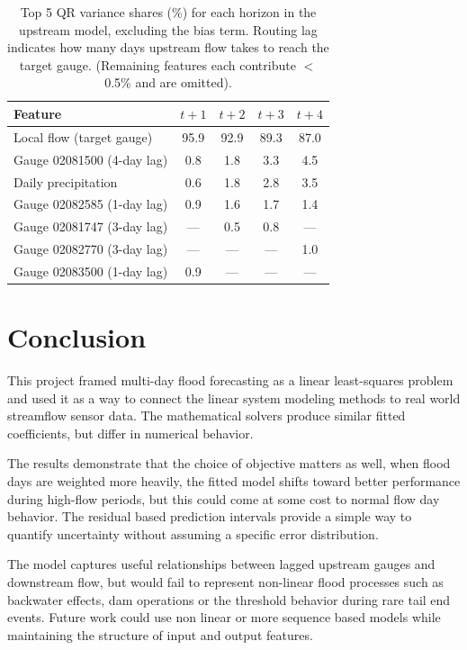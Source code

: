 \documentclass[10pt, twocolumn]{article}
\begin{document}
\begin{table}[h]
\centering
\caption{Top 5 QR variance shares (\%) for each horizon in the upstream model, excluding the bias
  term. Routing lag indicates how many days upstream flow takes to reach the target gauge. (Remaining features each contribute $<$0.5\% and are omitted).}
\label{tab:qr_contrib}
\footnotesize
\begin{tabularx}{\columnwidth}{@{}Xcccc@{}}
\toprule
\textbf{Feature} & \textbf{$t{+}1$} & \textbf{$t{+}2$} & \textbf{$t{+}3$} & \textbf{$t{+}4$} \\
\midrule
Local flow (target gauge)        & 95.9 & 92.9 & 89.3 & 87.0 \\
Gauge 02081500 \small(4-day lag) &  0.8 &  1.8 &  3.3 &  4.5 \\
Daily precipitation              &  0.6 &  1.8 &  2.8 &  3.5 \\
Gauge 02082585 \small(1-day lag) &  0.9 &  1.6 &  1.7 &  1.4 \\
Gauge 02081747 \small(3-day lag) &   --- &  0.5 &  0.8 &   --- \\
Gauge 02082770 \small(3-day lag) &   --- &   --- &   --- &  1.0 \\
Gauge 02083500 \small(1-day lag) &  0.9 &   --- &   --- &   --- \\
\bottomrule
\end{tabularx}
\end{table}

\section{Conclusion}

This project framed multi-day flood forecasting as a linear least-squares problem and used it as a way to connect the linear system modeling methods to real world streamflow sensor data. The mathematical solvers produce similar fitted coefficients, but differ in numerical behavior. 

The results demonstrate that the choice of objective matters as well, when flood days are weighted more heavily, the fitted model shifts toward better performance during high-flow periods, but this could come at some cost to normal flow day behavior. The residual based prediction intervals provide a simple way to quantify uncertainty without assuming a specific error distribution.

The model captures useful relationships between lagged upstream gauges and downstream flow, but would fail to represent non-linear flood processes such as backwater effects, dam operations or the threshold behavior during rare tail end events. Future work could use non linear or more sequence based models while maintaining the structure of input and output features. 




\end{document}
